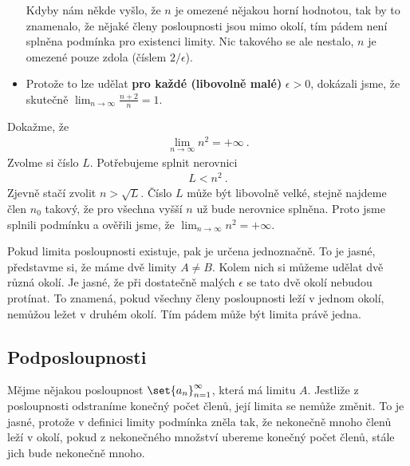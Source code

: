 \begin{example}
\begin{itemize}
        Kdyby nám někde vyšlo, že $n$ je omezené nějakou horní hodnotou, tak by to znamenalo, že nějaké členy posloupnosti jsou mimo okolí, tím pádem není splněna podmínka pro existenci limity. Nic takového se ale nestalo, $n$ je omezené pouze zdola (číslem $2/\epsilon$).

        \item Protože to lze udělat \textbf{pro každé (libovolně malé)} $\epsilon>0$, dokázali jsme, že skutečně $\lim_{n \rightarrow \infty} \frac{n+2}{n} = 1$.
    \end{itemize}

    
\end{example}

\begin{example}
    Dokažme, že \begin{align}
        \lim_{n \rightarrow \infty} n^2 = + \infty \:.
    \end{align}
    Zvolme si číslo $L$. Potřebujeme splnit nerovnici
    \begin{align}
        L < n^2 \:.
    \end{align}
    Zjevně stačí zvolit $n > \sqrt{L}$. Číslo $L$ může být libovolně velké, stejně najdeme člen $n_0$ takový, že pro všechna vyšší $n$ už bude nerovnice splněna. Proto jsme splnili podmínku a ověřili jsme, že $\lim_{n \rightarrow \infty} n^2 = + \infty$.
\end{example}


\begin{example}
    Pokud limita posloupnosti existuje, pak je určena jednoznačně. To je jasné, představme si, že máme dvě limity $A \neq B$. Kolem nich si můžeme udělat dvě různá okolí. Je jasné, že při dostatečně malých $\epsilon$ se tato dvě okolí nebudou protínat. To znamená, pokud všechny členy posloupnosti leží v jednom okolí, nemůžou ležet v druhém okolí. Tím pádem může být limita právě jedna.
\end{example}

\subsection*{Podposloupnosti}

Mějme nějakou posloupnost $\set{a_n}_{n=1}^\infty$, která má limitu $A$. Jestliže z posloupnosti odstraníme konečný počet členů, její limita se nemůže změnit. To je jasné, protože v definici limity podmínka zněla tak, že nekonečně mnoho členů leží v okolí, pokud z nekonečného množství ubereme konečný počet členů, stále jich bude nekonečně mnoho.

